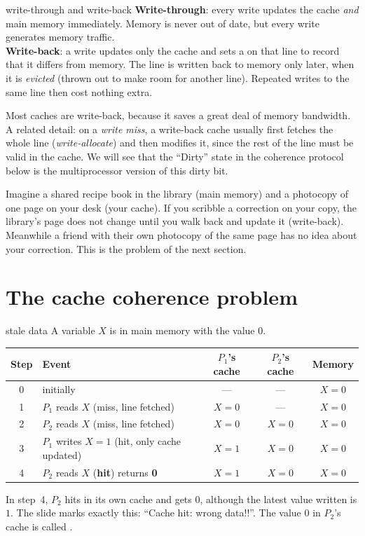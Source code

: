 \begin{definition}{write-through and write-back}
\textbf{Write-through}: every write updates the cache \emph{and} main memory immediately. Memory is never out of
date, but every write generates memory traffic.\\
\textbf{Write-back}: a write updates only the cache and sets a  on that line to record that it
differs from memory. The line is written back to memory only later, when it is \emph{evicted} (thrown out to make room for another
line). Repeated writes to the same line then cost nothing extra.
\end{definition}

Most caches are write-back, because it saves a great deal of memory bandwidth. A related detail: on a
\emph{write miss}, a write-back cache usually first fetches the whole line (\emph{write-allocate}) and then modifies it,
since the rest of the line must be valid in the cache. We will see that the ``Dirty'' state in the coherence protocol
below is the multiprocessor version of this dirty bit.

\begin{intuition}
Imagine a shared recipe book in the library (main memory) and a photocopy of one page on your desk (your cache). If you
scribble a correction on your copy, the library's page does not change until you walk back and
update it (write-back). Meanwhile a friend with their own photocopy of the same page has no idea about your correction. This is the problem
of the next section.
\end{intuition}

\section{The cache coherence problem}

\begin{workedex}{stale data}
A variable $X$ is in main memory with the value $0$.
\begin{center}
\small
\begin{tabular}{@{}clccc@{}}
\toprule
Step & Event & $P_1$'s cache & $P_2$'s cache & Memory\\
\midrule
0 & initially & --- & --- & $X=0$\\
1 & $P_1$ reads $X$ (miss, line fetched) & $X=0$ & --- & $X=0$\\
2 & $P_2$ reads $X$ (miss, line fetched) & $X=0$ & $X=0$ & $X=0$\\
3 & $P_1$ writes $X=1$ (hit, only cache updated) & $X=1$ & $X=0$ & $X=0$\\
4 & $P_2$ reads $X$ (\textbf{hit}) returns \textbf{0} & $X=1$ & $X=0$ & $X=0$\\
\bottomrule
\end{tabular}
\end{center}
In step~4, $P_2$ hits in its own cache and gets $0$, although the latest value written is $1$. The slide marks
exactly this: ``Cache hit: wrong data!!''. The value $0$ in $P_2$'s cache is called .
\end{workedex}

